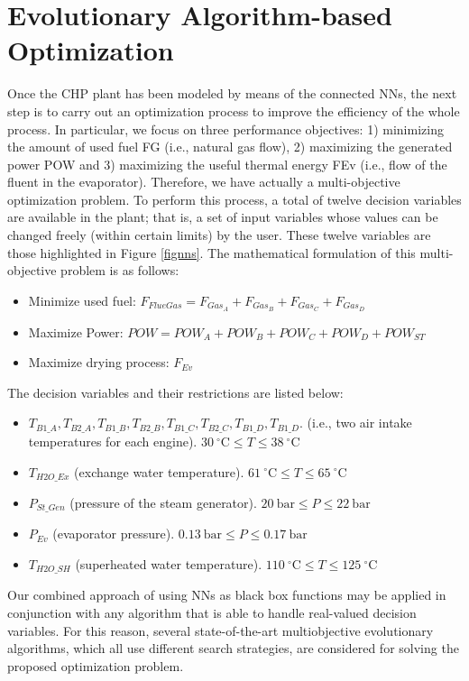 \section{Evolutionary Algorithm-based Optimization}
\label{sec:optimization}
Once the CHP plant has been modeled by means of the connected NNs, the next step is to  carry out an optimization process to improve the efficiency of the whole process. In particular, we focus on three performance objectives: 1) minimizing the amount of used fuel FG (i.e., natural gas flow), 2) maximizing the generated power POW and 3) maximizing the useful thermal energy FEv (i.e., flow of the fluent in the evaporator). Therefore, we have actually a multi-objective optimization problem. To perform this process, a total of twelve decision variables  are available in the plant; that is, a set of input variables whose values can be changed freely (within certain limits) by the user. These twelve variables are those highlighted in  Figure  \ref{fignns}. The mathematical formulation of this multi-objective problem is as follows:
%
\begin{itemize}[-]
	\item Minimize used fuel:		$F_{FlueGas} = F_{Gas_A} + F_{Gas_B} + F_{Gas_C} + F_{Gas_D}$
	\item Maximize Power:		$POW = POW_A + POW_B + POW_C + POW_D + POW_{ST}$
	\item Maximize drying process: 	$F_{Ev}$
\end{itemize}
%
The decision variables and their restrictions are listed below:
%
\begin{itemize}[-]
	\item $T_{B1\_A}, T_{B2\_A}, T_{B1\_B}, T_{B2\_B}, T_{B1\_C}, T_{B2\_C}, T_{B1\_D}, T_{B1\_D}$. (i.e., two air intake temperatures for each engine). $30~^{\circ}\textrm{C} \leq T  \leq  38~^{\circ}\textrm{C}$
	\item $T_{H2O\_Ex}$ (exchange water temperature). $61~^{\circ}\textrm{C}  \leq T  \leq  65~^{\circ}\textrm{C}$
	\item $P_{St\_Gen}$ (pressure of the steam generator). $20~\textrm{bar}  \leq  P  \leq  22~\textrm{bar}$
	\item $P_{Ev}$ (evaporator pressure). $0.13~\textrm{bar}  \leq  P  \leq  0.17~\textrm{bar}$
	\item $T_{H2O\_SH}$ (superheated water temperature). $110~^{\circ}\textrm{C}  \leq  T  \leq  125~^{\circ}\textrm{C}$
\end{itemize}

Our combined approach of using NNs as black box functions may be applied in conjunction with any algorithm that is able to handle real-valued decision variables. For this reason, several state-of-the-art multiobjective evolutionary algorithms, which all use different search strategies, are considered for solving the proposed optimization problem.

